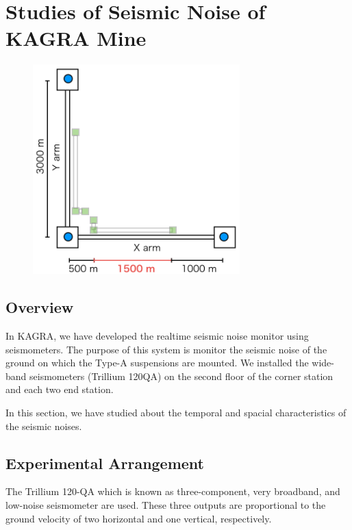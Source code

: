 \section{Studies of Seismic Noise of KAGRA Mine} \label{sec:33}
\begin{figure}[h]
  \begin{center}   
    \includegraphics[width=8cm]{./img_chap3/img328a.png}
    \caption{}\label{img:img328a}
  \end{center}
\end{figure}

\subsection{Overview}
In KAGRA, we have developed the realtime seismic noise monitor using seismometers. The purpose of this system is monitor the seismic noise of the ground on which the Type-A suspensions are mounted. We installed the wide-band seismometers (Trillium 120QA) on the second floor of the corner station and each two end station. 

In this section, we have studied about the temporal and spacial characteristics of the seismic noises.

\subsection{Experimental Arrangement}\label{sec:331}
The Trillium 120-QA which is known as three-component, very broadband, and low-noise seismometer are used. These three outputs are proportional to the ground velocity of two horizontal and one vertical, respectively. 

